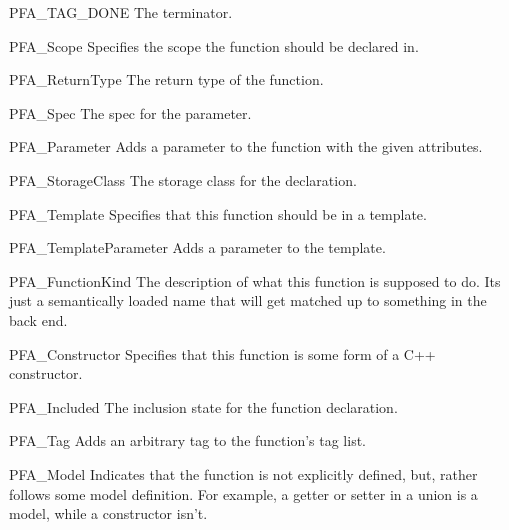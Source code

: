 \begin{cprototypelist}
  \begin{cidentifierlist}
    \item[PFA_TAG_DONE] \tagtypenull{} The terminator.

    \item[PFA_Scope]  Specifies the scope the
    function should be declared in.

    \item[PFA_ReturnType]  The return type of
    the function.

    \item[PFA_Spec]  The spec for the parameter.

    \item[PFA_Parameter]  Adds a parameter to the function with the given
    attributes.

    \item[PFA_StorageClass]  The
    storage class for the declaration.

    \item[PFA_Template] \tagtypenull{} Specifies that this function should be
    in a template.

    \item[PFA_TemplateParameter]  Adds a parameter to the
    template.

    \item[PFA_FunctionKind]  The description of
    what this function is supposed to do.  Its just a semantically loaded name
    that will get matched up to something in the back end.

    \item[PFA_Constructor] \tagtypenull{} Specifies that this function is some
    form of a C++ constructor.

    \item[PFA_Included]  The inclusion state
    for the function declaration.

    \item[PFA_Tag]  Adds an arbitrary tag to the function's tag
    list.

    \item[PFA_Model] \tagtypenull{} Indicates that the function is not
    explicitly defined, but, rather follows some model definition.  For
    example, a getter or setter in a union is a model, while a constructor
    isn't.


\end{cidentifierlist}
\end{cprototypelist}
